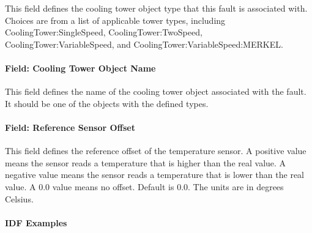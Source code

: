 This field defines the cooling tower object type that this fault is associated with. Choices are from a list of applicable tower types, including CoolingTower:SingleSpeed, CoolingTower:TwoSpeed, CoolingTower:VariableSpeed, and CoolingTower:VariableSpeed:MERKEL.

\paragraph{Field: Cooling Tower Object Name}\label{field-tower-object-name}

This field defines the name of the cooling tower object associated with the fault. It should be one of the objects with the defined types.

\paragraph{Field: Reference Sensor Offset}\label{field-reference-sensor-offset}

This field defines the reference offset of the temperature sensor. A positive value means the sensor reads a temperature that is higher than the real value. A negative value means the sensor reads a temperature that is lower than the real value. A 0.0 value means no offset. Default is 0.0. The units are in degrees Celsius.

\paragraph{IDF Examples}

